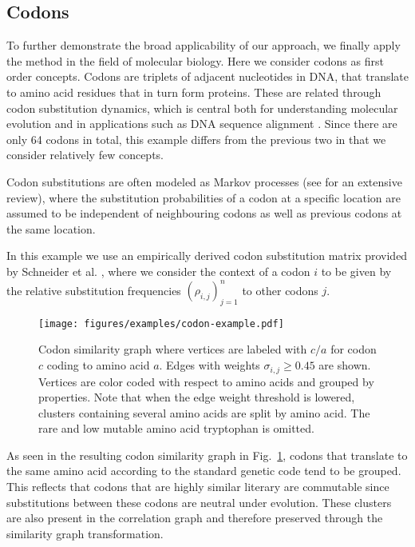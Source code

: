 \documentclass{sig-alternate}
\newcommand{\rn}[1]{\rho_{#1}}
\newcommand{\sy}[1]{\sigma_{#1}}
\begin{document}
\subsection{Codons}

To further demonstrate the broad applicability of our approach, we finally apply the method in the field of molecular biology.
Here we consider codons as first order concepts. Codons are triplets of
adjacent nucleotides in DNA, that translate to amino acid residues that in turn form proteins.  These are related
through codon substitution dynamics, which is central both for understanding molecular evolution and in applications
such as DNA sequence alignment \cite{Anisimova09}. Since there are only 64 codons in total, this example differs from
the previous two in that we consider relatively few concepts.

Codon substitutions are often modeled as Markov processes (see \cite{Anisimova09} for an extensive review), where the
substitution probabilities of a codon at a specific location are assumed to be independent of neighbouring codons as
well as previous codons at the same location.

In this example we use an empirically derived codon substitution matrix provided by Schneider et al.
\cite{Schneider2005}, where we consider the context of a codon $i$ to be given by the relative substitution frequencies
$(\rn{i,j})_{j=1}^n$ to other codons $j$.

\begin{figure}
\begin{centering}
\texttt{[image: figures/examples/codon-example.pdf]}
\end{centering}
\caption{Codon similarity graph where vertices are labeled with $c/a$ for codon $c$ coding to amino acid $a$. Edges
with weights $\sy{i,j} \geq 0.45$ are shown. Vertices are color coded with respect to amino acids and grouped by
properties. Note that when the edge weight threshold is lowered, clusters containing several amino acids are split by
amino acid. The rare and low mutable amino acid tryptophan is omitted. }
\label{fig:codons}
\end{figure}

As seen in the resulting codon similarity graph in Fig.\ \ref{fig:codons}, codons that translate to the same amino acid according
to the standard genetic code \cite{Nirenberg65} tend to be grouped. This reflects that codons that are highly similar
literary are commutable since substitutions between these codons are neutral under evolution. These clusters are also
present in the correlation graph and therefore preserved through the similarity graph transformation.
\end{document}
